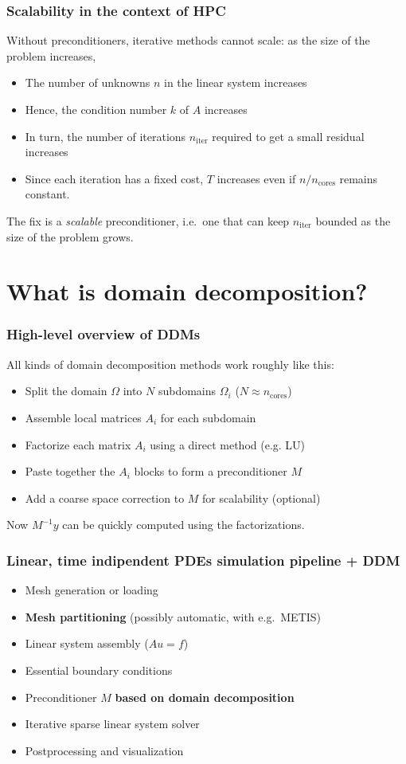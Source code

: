 \documentclass{beamer}
\begin{document}
\begin{frame}
\frametitle{Scalability in the context of HPC}
Without preconditioners, iterative methods cannot scale:
as the size of the problem increases,
\begin{itemize}%
\item The number of unknowns $n$ in the linear system increases
\item Hence, the condition number $k$ of $A$ increases
\item In turn, the number of iterations $n_\text{iter}$
	required to get a small residual increases
\item Since each iteration has a fixed cost, $T$ increases even if
	$n/n_\text{cores}$ remains constant.
\end{itemize}
The fix is a \emph{scalable} preconditioner, i.e.\ one that can
keep $n_\text{iter}$ bounded as the size of the problem grows.
\end{frame}

\section{What is domain decomposition?}
\begin{frame}
\frametitle{High-level overview of DDMs}
All kinds of domain decomposition methods work roughly like this:
\begin{itemize}%
\item Split the domain $\Omega$ into $N$ %
	subdomains $\Omega_i$ ($N \approx n_\text{cores}$)
\item Assemble local matrices $A_i$ for each subdomain
\item Factorize each matrix $A_i$ using a direct method (e.g. LU)
\item Paste together the $A_i$ blocks to form a preconditioner $M$
\item Add a coarse space correction to $M$ for scalability (optional)
\end{itemize}
Now $M^{-1}y$ can be quickly computed using the factorizations.
\end{frame}

\begin{frame}
\frametitle{Linear, time indipendent PDEs simulation pipeline + DDM}
\begin{itemize}%
\item Mesh generation or loading
\item \textbf{Mesh partitioning} (possibly automatic, with e.g.\ METIS)
\item Linear system assembly ($Au=f$)
\item Essential boundary conditions
\item Preconditioner $M$ \textbf{based on domain decomposition}
\item Iterative sparse linear system solver
\item Postprocessing and visualization
\end{itemize}
\end{frame}
\end{document}
